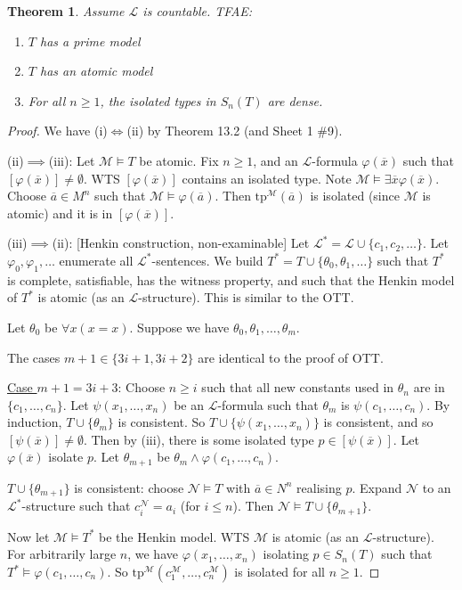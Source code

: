 \documentclass[]{article}
\theoremstyle{custhm}
\newtheorem{theorem}{Theorem}[section]
\theoremstyle{cusdef}
\theoremstyle{custhm}
\theoremstyle{custhm}
\theoremstyle{custhm}
\theoremstyle{ex}
\theoremstyle{custhm}
\theoremstyle{cusdef}
\theoremstyle{remark}
\theoremstyle{remark}
\renewcommand{\L}{\mathcal{L}}
\newcommand{\M}{\mathcal{M}}
\renewcommand{\phi}{\varphi}
\renewcommand{\bar}{\overline}
\newcommand{\tp}{\textrm{tp}}
\newcommand{\N}{\mathcal{N}}
\begin{document}
\begin{theorem}
Assume $\L$ is countable. TFAE:
\begin{enumerate}[label=\roman*)]
	\item $T$ has a prime model
	\item $T$ has an atomic model
	\item For all $n\ge 1$, the isolated types in $S_n(T)$ are dense.
\end{enumerate}
\end{theorem}
\begin{proof}
We have (i)$\iff$(ii) by Theorem 13.2 (and Sheet 1 \#9).

(ii)$\implies$(iii): Let $\M\models T$ be atomic. Fix $n\ge 1$, and an $\L$-formula $\phi(\bar{x})$ such that $[\phi(\bar{x})]\ne \emptyset$. WTS $[\phi(\bar{x})]$ contains an isolated type. Note $\M\models \exists \bar{x}\phi(\bar{x})$. Choose $\bar{a}\in M^n$ such that $\M\models \phi(\bar{a})$. Then $\tp^\M(\bar{a})$ is isolated (since $\M$ is atomic) and it is in $[\phi(\bar{x})]$.

(iii)$\implies$(ii): [Henkin construction, non-examinable] Let $\L^\ast = \L\cup\{c_1,c_2,\dots\}$. Let $\phi_0,\phi_1,\dots$ enumerate all $\L^\ast$-sentences. We build $T^\ast = T \cup \{\theta_0,\theta_1,\dots\}$ such that $T^\ast$ is complete, satisfiable, has the witness property, and such that the Henkin model of $T^\ast$ is atomic (as an $\L$-structure). This is similar to the OTT.

Let $\theta_0$ be $\forall x(x=x)$. Suppose we have $\theta_0,\theta_1,\dots,\theta_m$.

The cases $m+1\in \{3i+1,3i+2\}$ are identical to the proof of OTT.

\underline{Case $m+1 = 3i+3$}: Choose $n\ge i$ such that all new constants used in $\theta_n$ are in $\{c_1,\dots,c_n\}$. Let $\psi(x_1,\dots,x_n)$ be an $\L$-formula such that $\theta_m$ is $\psi(c_1,\dots,c_n)$. By induction, $T\cup\{\theta_m\}$ is consistent. So $T\cup\{\psi(x_1,\dots,x_n)\}$ is consistent, and so $[\psi(\bar{x})]\ne \emptyset$. Then by (iii), there is some isolated type $p \in [\psi(\bar{x})]$. Let $\phi(\bar{x})$ isolate $p$. Let $\theta_{m+1}$ be $\theta_m\land \phi(c_1,\dots,c_n)$.

$T\cup\{\theta_{m+1}\}$ is consistent: choose $\N\models T$ with $\bar{a}\in N^n$ realising $p$. Expand $\N$ to an $\L^\ast$-structure such that $c_i^\N = a_i$ (for $i\le n$). Then $\N\models T\cup\{\theta_{m+1}\}$.

Now let $\M\models T^\ast$ be the Henkin model. WTS $\M$ is atomic (as an $\L$-structure). For arbitrarily large $n$, we have $\phi(x_1,\dots,x_n)$ isolating $p \in S_n(T)$ such that $T^\ast \models \phi(c_1,\dots,c_n)$. So $\tp^\M(c_1^\M,\dots,c_n^\M)$ is isolated for all $n\ge1$.


\end{proof}
\end{document}
